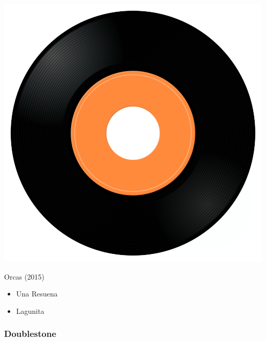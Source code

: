 \begin{minipage}[t]{0.25\textwidth}
\captionsetup{type=figure}
\includegraphics[width=\textwidth]{Images/cover.png}
\caption*{Orcas (2015)}
\end{minipage}
\begin{minipage}[t]{0.25\textwidth}\vspace{0pt}
\begin{itemize}[nosep,leftmargin=1em,labelwidth=*,align=left]
	\setlength{\itemsep}{0pt}
	\item Una Resuena
	\item Lagunita
\end{itemize}
\end{minipage}

\subsubsection{Doublestone}

